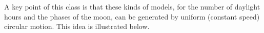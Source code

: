 \documentclass{ximera}
\begin{document}


 
\begin{onlineOnly}
    \begin{center}
\end{center}
\end{onlineOnly}


A key point of this class is that these kinds of models, for the number of daylight hours and the phases of the moon, can be generated by uniform (constant speed) circular motion. This idea is illustrated below.

\begin{onlineOnly}
    \begin{center}
\end{center}
\end{onlineOnly}


\begin{onlineOnly}
    \begin{center}
\end{center}
\end{onlineOnly}
\end{document}
